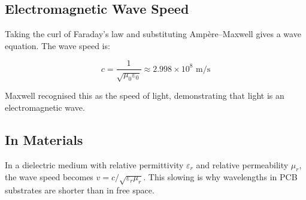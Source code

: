 
				

\subsection{Electromagnetic Wave Speed}

				


				

Taking the curl of Faraday's law and substituting Ampère–Maxwell gives a wave equation. The wave speed is:

				
\[c = \dfrac{1}{\sqrt{\mu_0 \varepsilon_0}} \approx 2.998 \times 10^8 \text{ m/s}\]

				

Maxwell recognised this as the speed of light, demonstrating that light is an electromagnetic wave.

				

\subsection{In Materials}

				

In a dielectric medium with relative permittivity $\varepsilon_r$ and relative permeability $\mu_r$, the wave speed becomes $v = c/\sqrt{\varepsilon_r \mu_r}$. This slowing is why wavelengths in PCB substrates are shorter than in free space.



